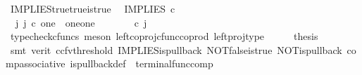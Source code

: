 \begin{isabellebody}
\endisatagproof
{\isafoldproof}%
%
\isadelimproof
\isanewline
%
\endisadelimproof
\isanewline
{}\isamarkupfalse%
\ IMPLIES{\isacharunderscore}{\kern0pt}true{\isacharunderscore}{\kern0pt}true{\isacharunderscore}{\kern0pt}is{\isacharunderscore}{\kern0pt}true{\isacharcolon}{\kern0pt}\isanewline
\ \ {\isachardoublequoteopen}IMPLIES\ {\isasymcirc}\isactrlsub c\ {\isasymlangle}{\isasymt}{\isacharcomma}{\kern0pt}{\isasymt}{\isasymrangle}\ {\isacharequal}{\kern0pt}\ {\isasymt}{\isachardoublequoteclose}\isanewline
%
\isadelimproof
%
\endisadelimproof
%
\isatagproof
{}\isamarkupfalse%
\ {\isacharminus}{\kern0pt}\ \ \ \isanewline
\ \ \isamarkupfalse%
\ {\isachardoublequoteopen}{\isasymexists}\ j{\isachardot}{\kern0pt}\ j\ {\isasymin}\isactrlsub c\ one\ {\isasymCoprod}\ {\isacharparenleft}{\kern0pt}one{\isasymCoprod}one{\isacharparenright}{\kern0pt}\ {\isasymand}\ {\isacharparenleft}{\kern0pt}{\isasymlangle}{\isasymt}{\isacharcomma}{\kern0pt}\ {\isasymt}{\isasymrangle}{\isasymamalg}\ {\isacharparenleft}{\kern0pt}{\isasymlangle}{\isasymf}{\isacharcomma}{\kern0pt}\ {\isasymf}{\isasymrangle}\ {\isasymamalg}{\isasymlangle}{\isasymf}{\isacharcomma}{\kern0pt}\ {\isasymt}{\isasymrangle}{\isacharparenright}{\kern0pt}{\isacharparenright}{\kern0pt}\ {\isasymcirc}\isactrlsub c\ j\ \ {\isacharequal}{\kern0pt}\ {\isasymlangle}{\isasymt}{\isacharcomma}{\kern0pt}{\isasymt}{\isasymrangle}{\isachardoublequoteclose}\isanewline
\ \ \ \ \isamarkupfalse%
\ {\isacharparenleft}{\kern0pt}typecheck{\isacharunderscore}{\kern0pt}cfuncs{\isacharcomma}{\kern0pt}\ meson\ left{\isacharunderscore}{\kern0pt}coproj{\isacharunderscore}{\kern0pt}cfunc{\isacharunderscore}{\kern0pt}coprod\ left{\isacharunderscore}{\kern0pt}proj{\isacharunderscore}{\kern0pt}type{\isacharparenright}{\kern0pt}\isanewline
\ \ \isamarkupfalse%
\ \isamarkupfalse%
\ {\isacharquery}{\kern0pt}thesis\isanewline
\ \ \ \ \isamarkupfalse%
\ {\isacharparenleft}{\kern0pt}smt\ {\isacharparenleft}{\kern0pt}verit{\isacharcomma}{\kern0pt}\ ccfv{\isacharunderscore}{\kern0pt}threshold{\isacharparenright}{\kern0pt}\ IMPLIES{\isacharunderscore}{\kern0pt}is{\isacharunderscore}{\kern0pt}pullback\ NOT{\isacharunderscore}{\kern0pt}false{\isacharunderscore}{\kern0pt}is{\isacharunderscore}{\kern0pt}true\ NOT{\isacharunderscore}{\kern0pt}is{\isacharunderscore}{\kern0pt}pullback\ comp{\isacharunderscore}{\kern0pt}associative{}\ is{\isacharunderscore}{\kern0pt}pullback{\isacharunderscore}{\kern0pt}def\ \ terminal{\isacharunderscore}{\kern0pt}func{\isacharunderscore}{\kern0pt}comp{\isacharparenright}{\kern0pt}\isanewline

\end{isabellebody}
